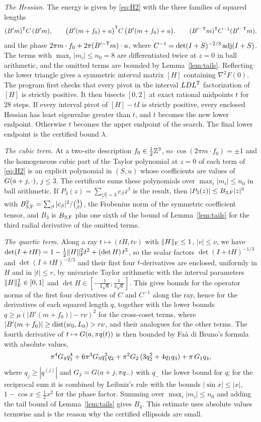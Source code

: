 \emph{The Hessian.} The energy is given by \eqref{eq:H2} with the three families of squared lengths
\[
  (B'm)^\mathsf T C\,(B'm),\qquad \bigl(B'(m+f_0)+u\bigr)^\mathsf T C\,\bigl(B'(m+f_0)+u\bigr),\qquad (B'^{-\mathsf T}m)^\mathsf T C^{-1}(B'^{-\mathsf T}m),
\]
and the phase $2\pi m\cdot f_0+2\pi(B'^{-\mathsf T}m)\cdot u$, where $C^{-1}=\det(I+S)^{-2/3}\operatorname{adj}(I+S)$. The terms with
$\max_i|m_i|\le n_0=8$ are differentiated twice at $z=0$ in ball arithmetic, and the omitted terms are bounded by
Lemma~\ref{lem:tails}. Reflecting the lower triangle gives a symmetric interval matrix $[H]$ containing $\nabla^2F(0)$.
The program first checks that every pivot in the interval $LDL^\mathsf T$ factorization of $[H]$ is strictly positive.
It then bisects $[0,2]$ at exact rational midpoints $t$ for $28$ steps. If every interval pivot of $[H]-tI$ is strictly
positive, every enclosed Hessian has least eigenvalue greater than $t$, and $t$ becomes the new lower endpoint.
Otherwise $t$ becomes the upper endpoint of the search. The final lower endpoint is the certified bound $\lambda$.

\emph{The cubic term.} At a two-site description $f_0\in\frac12\mathbb Z^3$, so $\cos(2\pi m\cdot f_0)=\pm1$ and the homogeneous cubic part
of the Taylor polynomial at $z=0$ of each term of \eqref{eq:H2} is an explicit polynomial in $(S,u)$ whose coefficients are values of
$G(a+j,\cdot)$, $j\le3$. The certificate sums these polynomials over $\max_i|m_i|\le n_0$ in ball arithmetic. If
$P_3(z)=\sum_{|\beta|=3}c_\beta z^\beta$ is the result, then $|P_3(z)|\le B_{3,\mathrm F}|z|^3$ with
$B_{3,\mathrm F}^2=\sum_\beta|c_\beta|^2/\binom3\beta$, the Frobenius norm of the symmetric coefficient tensor, and $B_3$ is $B_{3,\mathrm F}$ plus
one sixth of the bound of Lemma~\ref{lem:tails} for the third radial derivative of the omitted terms.

\emph{The quartic term.} Along a ray $t\mapsto(tH,tv)$ with $\|H\|_\mathrm F\le1$, $|v|\le\nu$, we have
$\det(I+tH)=1-\frac12\|H\|_\mathrm F^2t^2+(\det H)\,t^3$, so the scalar factors $\det(I+tH)^{-1/3}$ and $\det(I+tH)^{-2/3}$ and their first
four $t$-derivatives are enclosed, uniformly in $H$ and in $|t|\le r$, by univariate Taylor arithmetic with the interval parameters
$\|H\|_\mathrm F^2\in[0,1]$ and $\det H\in[-\frac1{3\sqrt6},\frac1{3\sqrt6}]$. This gives bounds for the operator norms of the first four
derivatives of $C$ and $C^{-1}$ along the ray, hence for the derivatives of each squared length $q$, together with the lower bounds
$q\ge\mu(|B'(m+f_0)|-r\nu)^2$ for the cross-coset terms, where $|B'(m+f_0)|\ge\operatorname{dist}(w_0,L_0)>r\nu$, and their analogues for the other
terms. The fourth derivative of $t\mapsto G(a,\pi q(t))$ is then bounded by Fa\`a di Bruno's formula with absolute values,
\begin{equation}\label{eq:faa4}
  \pi^4G_4q_1^4+6\pi^3G_3q_1^2q_2+\pi^2G_2\,(3q_2^2+4q_1q_3)+\pi\,G_1q_4 ,
\end{equation}
where $q_j\ge|q^{(j)}|$ and $G_j=G(a+j,\pi q_-)$ with $q_-$ the lower bound for $q$; for the reciprocal sum it is combined by
Leibniz's rule with the bounds $|\sin x|\le|x|$, $1-\cos x\le\frac12x^2$ for the phase factor. Summing over $\max_i|m_i|\le n_0$ and
adding the tail bound of Lemma~\ref{lem:tails} gives $B_4$. This estimate uses absolute values termwise and is the reason why the
certified ellipsoids are small.

